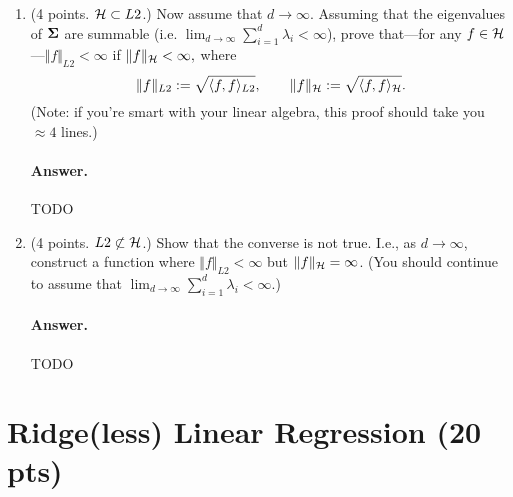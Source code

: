 \documentclass[11pt,letterpaper]{article}
\newenvironment{answer}{%
    \vspace{1em}
    \color{black}
    \paragraph{Answer.}
  }{%
    \vspace{1em}
  }
\begin{document}
\begin{enumerate}
    (Hint: This proof should take you $\approx 6$ lines.)

\begin{answer}
  TODO
\end{answer}



\begin{answer}
  TODO
\end{answer}


  \item (4 points. $\mathcal{H} \subset L2$.)
    Now assume that $d \to \infty$.
    Assuming that the eigenvalues of ${\bm{\Sigma}}$ are summable (i.e. $\lim_{d \to \infty} \sum_{i=1}^d \lambda_i < \infty$),
    prove that---for any $f \in \mathcal{H}$---$\Vert f \Vert_{L2} < \infty$ if $\Vert f \Vert_{\mathcal{H}} < \infty,$ where
    $$\Vert f \Vert_{L2} := \sqrt{\langle f, f \rangle_{L2}}, \qquad \Vert f \Vert_{\mathcal{H}} := \sqrt{\langle f, f \rangle_{\mathcal{H}}}. $$
    (Note: if you're smart with your linear algebra, this proof should take you $\approx 4$ lines.)

\begin{answer}
  TODO
\end{answer}

  \item (4 points. $L2 \not\subset \mathcal{H}$.)
    Show that the converse is not true.
    I.e., as $d \to \infty$, construct a function where $\Vert f \Vert_{L2} < \infty$ but $\Vert f \Vert_{\mathcal{H}} = \infty$.
    (You should continue to assume that $\lim_{d \to \infty} \sum_{i=1}^d \lambda_i < \infty$.)

\begin{answer}
  TODO
\end{answer}
\end{enumerate}



\section{Ridge(less) Linear Regression (20 pts)}
\end{document}

